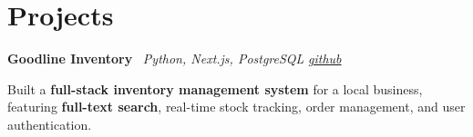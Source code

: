 \section{Projects}

    \hspace{0.5em} \textbf{Goodline Inventory} \textbar \  \textit{Python, Next.js, PostgreSQL}
\hfill \textit{\href{https://github.com/knarfthekant/goodline_inventory}{github}}
    \vspace{0.10 cm}
    \begin{onecolentry}
        \begin{highlights}
            \item Built a \textbf{full-stack inventory management system} for a local business, featuring \textbf{full-text search}, real-time stock tracking, order management, and user authentication.
        \end{highlights}
    \end{onecolentry}
    \vspace{0.10 cm}

